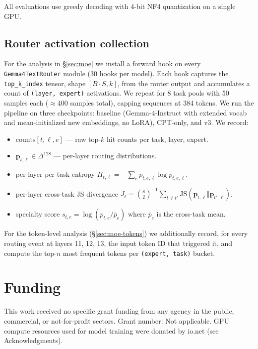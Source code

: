 \documentclass[11pt]{article}
\begin{document}
All evaluations use greedy decoding with 4-bit NF4 quantization on a single GPU.

\subsection{Router activation collection}
\label{sec:hooks}

For the analysis in \S\ref{sec:moe} we install a forward hook on every \texttt{Gemma4TextRouter} module (30 hooks per model). Each hook captures the \texttt{top\_k\_index} tensor, shape $[B \cdot S, k]$, from the router output and accumulates a count of \texttt{(layer, expert)} activations. We repeat for 8 task pools with 50 samples each ($\approx 400$ samples total), capping sequences at 384 tokens. We run the pipeline on three checkpoints: baseline (Gemma-4-Instruct with extended vocab and mean-initialized new embeddings, no LoRA), CPT-only, and v3. We record:
\begin{itemize}\setlength\itemsep{0pt}
\item $\mathrm{counts}[t, \ell, e]$ --- raw top-$k$ hit counts per task, layer, expert.
\item $\mathbf{p}_{t, \ell} \in \Delta^{128}$ --- per-layer routing distributions.
\item per-layer per-task entropy $H_{t,\ell} = -\sum_e p_{t,e,\ell} \log p_{t,e,\ell}$.
\item per-layer cross-task JS divergence $J_\ell = \binom{8}{2}^{-1} \sum_{t \neq t'} \mathrm{JS}(\mathbf{p}_{t,\ell} \Vert \mathbf{p}_{t',\ell})$.
\item specialty score $s_{t,e} = \log(p_{t,e} / \bar p_e)$ where $\bar p_e$ is the cross-task mean.
\end{itemize}

For the token-level analysis (\S\ref{sec:moe-tokens}) we additionally record, for every routing event at layers 11, 12, 13, the input token ID that triggered it, and compute the top-$n$ most frequent tokens per \texttt{(expert, task)} bucket.


\section*{Funding}

This work received no specific grant funding from any agency in the public, commercial, or not-for-profit sectors. Grant number: Not applicable. GPU compute resources used for model training were donated by io.net (see Acknowledgments).
\end{document}

